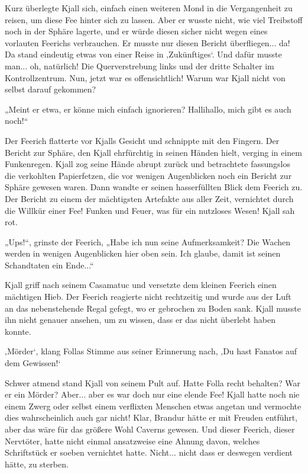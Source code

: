 Kurz überlegte Kjall sich, einfach einen weiteren Mond in die Vergangenheit zu reisen, um diese Fee hinter sich zu lassen. Aber er wusste nicht, wie viel Treibstoff noch in der Sphäre lagerte, und er würde diesen sicher nicht wegen eines vorlauten Feerichs verbrauchen. Er musste nur diesen Bericht überfliegen... da! Da stand eindeutig etwas von einer Reise in ‚Zukünftiges‘. Und dafür musste man... oh, natürlich! Die Querverstrebung links und der dritte Schalter im Kontrollzentrum. Nun, jetzt war es offensichtlich! Warum war Kjall nicht von selbst darauf gekommen?

„Meint er etwa, er könne mich einfach ignorieren? Hallihallo, mich gibt es auch noch!“

Der Feerich flatterte vor Kjalls Gesicht und schnippte mit den Fingern. Der Bericht zur Sphäre, den Kjall ehrfürchtig in seinen Händen hielt, verging in einem Funkenregen. Kjall zog seine Hände abrupt zurück und betrachtete fassungslos die verkohlten Papierfetzen, die vor wenigen Augenblicken noch ein Bericht zur Sphäre gewesen waren. Dann wandte er seinen hasserfüllten Blick dem Feerich zu. Der Bericht zu einem der mächtigsten Artefakte aus aller Zeit, vernichtet durch die Willkür einer Fee! Funken und Feuer, was für ein nutzloses Wesen! Kjall sah rot.

„Ups!“, grinste der Feerich, „Habe ich nun seine Aufmerksamkeit? Die Wachen werden in wenigen Augenblicken hier oben sein. Ich glaube, damit ist seinen Schandtaten ein Ende...“

Kjall griff nach seinem Casamatuc und versetzte dem kleinen Feerich einen mächtigen Hieb. Der Feerich reagierte nicht rechtzeitig und wurde aus der Luft an das nebenstehende Regal gefegt, wo er gebrochen zu Boden sank. Kjall musste ihn nicht genauer ansehen, um zu wissen, dass er das nicht überlebt haben konnte.

‚Mörder‘, klang Follas Stimme aus seiner Erinnerung nach, ‚Du hast Fanatos auf dem Gewissen!‘

Schwer atmend stand Kjall von seinem Pult auf. Hatte Folla recht behalten? War er ein Mörder? Aber... aber es war doch nur eine elende Fee! Kjall hatte noch nie einem Zwerg oder selbst einem verflixten Menschen etwas angetan und vermochte dies wahrscheinlich auch gar nicht! Klar, Brandur hätte er mit Freuden entführt, aber das wäre für das größere Wohl Caverns gewesen. Und dieser Feerich, dieser Nervtöter, hatte nicht einmal ansatzweise eine Ahnung davon, welches Schriftstück er soeben vernichtet hatte. Nicht... nicht dass er deswegen verdient hätte, zu sterben.

